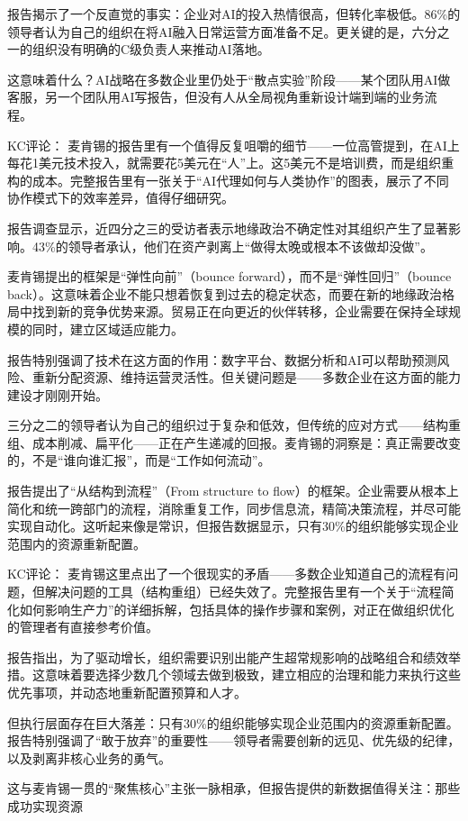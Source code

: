 \documentclass[11pt]{ctexart}
\begin{document}
报告揭示了一个反直觉的事实：企业对AI的投入热情很高，但转化率极低。86\%的领导者认为自己的组织在将AI融入日常运营方面准备不足。更关键的是，六分之一的组织没有明确的C级负责人来推动AI落地。

这意味着什么？AI战略在多数企业里仍处于“散点实验”阶段——某个团队用AI做客服，另一个团队用AI写报告，但没有人从全局视角重新设计端到端的业务流程。

KC评论： 麦肯锡的报告里有一个值得反复咀嚼的细节——一位高管提到，在AI上每花1美元技术投入，就需要花5美元在“人”上。这5美元不是培训费，而是组织重构的成本。完整报告里有一张关于“AI代理如何与人类协作”的图表，展示了不同协作模式下的效率差异，值得仔细研究。

报告调查显示，近四分之三的受访者表示地缘政治不确定性对其组织产生了显著影响。43\%的领导者承认，他们在资产剥离上“做得太晚或根本不该做却没做”。

麦肯锡提出的框架是“弹性向前”（bounce forward），而不是“弹性回归”（bounce back）。这意味着企业不能只想着恢复到过去的稳定状态，而要在新的地缘政治格局中找到新的竞争优势来源。贸易正在向更近的伙伴转移，企业需要在保持全球规模的同时，建立区域适应能力。

报告特别强调了技术在这方面的作用：数字平台、数据分析和AI可以帮助预测风险、重新分配资源、维持运营灵活性。但关键问题是——多数企业在这方面的能力建设才刚刚开始。

三分之二的领导者认为自己的组织过于复杂和低效，但传统的应对方式——结构重组、成本削减、扁平化——正在产生递减的回报。麦肯锡的洞察是：真正需要改变的，不是“谁向谁汇报”，而是“工作如何流动”。

报告提出了“从结构到流程”（From structure to flow）的框架。企业需要从根本上简化和统一跨部门的流程，消除重复工作，同步信息流，精简决策流程，并尽可能实现自动化。这听起来像是常识，但报告数据显示，只有30\%的组织能够实现企业范围内的资源重新配置。

KC评论： 麦肯锡这里点出了一个很现实的矛盾——多数企业知道自己的流程有问题，但解决问题的工具（结构重组）已经失效了。完整报告里有一个关于“流程简化如何影响生产力”的详细拆解，包括具体的操作步骤和案例，对正在做组织优化的管理者有直接参考价值。

报告指出，为了驱动增长，组织需要识别出能产生超常规影响的战略组合和绩效举措。这意味着要选择少数几个领域去做到极致，建立相应的治理和能力来执行这些优先事项，并动态地重新配置预算和人才。

但执行层面存在巨大落差：只有30\%的组织能够实现企业范围内的资源重新配置。报告特别强调了“敢于放弃”的重要性——领导者需要创新的远见、优先级的纪律，以及剥离非核心业务的勇气。

这与麦肯锡一贯的“聚焦核心”主张一脉相承，但报告提供的新数据值得关注：那些成功实现资源
\end{document}
